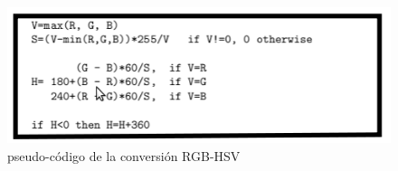 
\begin{figure}[tpb]
\begin{center}
  \includegraphics[scale=0.6]{vision/figures/hsvCode.png}



\caption[Conversi\'on RGB-HSV]{\label{code:hsv}pseudo-c\'odigo de la conversi\'on RGB-HSV}
\end{center}
\end{figure}

